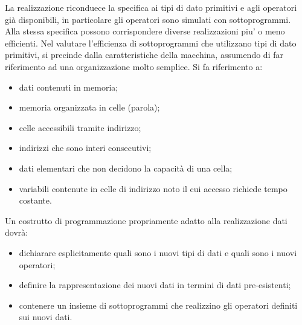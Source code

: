 \documentclass[12pt]{report}
\begin{document}
	La realizzazione riconduece la specifica ai tipi di dato primitivi e agli operatori già disponibili, in particolare gli operatori sono simulati con sottoprogrammi. \\
	Alla stessa specifica possono corrispondere diverse realizzazioni piu' o meno efficienti. Nel valutare l'efficienza di sottoprogrammi che utilizzano tipi di dato primitivi, si precinde dalla caratteristiche della macchina, assumendo di far riferimento ad una organizzazione molto semplice. Si fa riferimento a:
	\begin{itemize}
		\item dati contenuti in memoria;
		\item memoria organizzata in celle (parola);
		\item celle accessibili tramite indirizzo;
		\item indirizzi che sono interi consecutivi;
		\item dati elementari che non decidono la capacità di una cella;
		\item variabili contenute in celle di indirizzo noto il cui accesso richiede tempo costante.
	\end{itemize}
	Un costrutto di programmazione propriamente adatto alla realizzazione dati dovrà:
	\begin{itemize}
		\item dichiarare esplicitamente quali sono i nuovi tipi di dati e quali sono i nuovi operatori;
		\item definire la rappresentazione dei nuovi dati in termini di dati pre-esistenti;
		\item contenere un insieme di sottoprogrammi che realizzino gli operatori definiti sui nuovi dati.
	\end{itemize}
\end{document}
